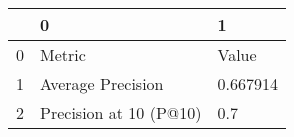 \begin{tabular}{lll}
\toprule
{} &                       0 &         1 \\
\midrule
0 &                  Metric &     Value \\
1 &       Average Precision &  0.667914 \\
2 &  Precision at 10 (P@10) &       0.7 \\
\bottomrule
\end{tabular}
